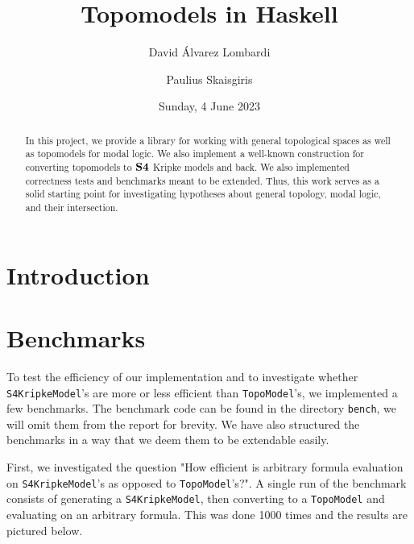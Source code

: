 \documentclass[12pt,a4paper]{article}
\title{Topomodels in Haskell}
\author{David Álvarez Lombardi \and Paulius Skaisgiris}
\date{Sunday, 4 June 2023}
\begin{document}
\maketitle

\begin{abstract}
In this project, we provide a library for working with general topological spaces as well as topomodels for modal logic.
We also implement a well-known construction for converting topomodels to $\mathbf{S4}$ Kripke models and back. We also implemented
correctness tests and benchmarks meant to be extended. Thus, this work serves as a solid starting point for investigating
hypotheses about general topology, modal logic, and their intersection.
\end{abstract}

\tableofcontents

\clearpage


\section{Introduction}
\TODO



















\section{Benchmarks}

To test the efficiency of our implementation and to investigate whether \verb|S4KripkeModel|'s
are more or less efficient than \verb|TopoModel|'s, we implemented a few benchmarks. The benchmark code
can be found in the directory \verb|bench|, we will omit them from the report for brevity. We have also
structured the benchmarks in a way that we deem them to be extendable easily.

First, we investigated the question "How efficient is arbitrary formula evaluation on \verb|S4KripkeModel|'s
as opposed to \verb|TopoModel|'s?". A single run of the benchmark consists of generating a \verb|S4KripkeModel|,
then converting to a \verb|TopoModel| and evaluating on an arbitrary formula. This was done 1000 times and the
results are pictured below.
\end{document}
